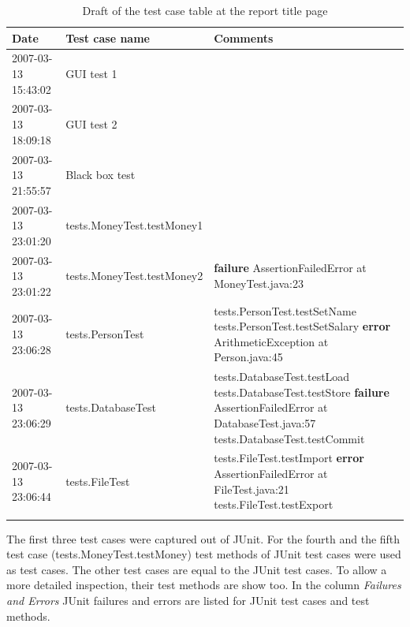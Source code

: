 \begin{footnotesize}
\begin{longtable}{l|l|p{6.9cm}}
   \textbf{\normalsize Date} &
   \textbf{\normalsize Test case name} &
   \textbf{\normalsize Comments} \\\hline

   2007-03-13 15:43:02 & GUI test 1 & \\\hline
   2007-03-13 18:09:18 & GUI test 2 & \\\hline
   2007-03-13 21:55:57 & Black box test & \\\hline

   2007-03-13 23:01:20 & tests.MoneyTest.testMoney1 & \\\hline
   2007-03-13 23:01:22 & tests.MoneyTest.testMoney2 &
     \textbf{{\color{JUnitFailure}failure}} \newline 
     AssertionFailedError at MoneyTest.java:23 \\\hline

   2007-03-13 23:06:28 & tests.PersonTest & 
     tests.PersonTest.testSetName \newline 
     tests.PersonTest.testSetSalary \newline
     \textbf{{\color{JUnitError}error}} \newline 
     ArithmeticException at Person.java:45 \\\hline

   2007-03-13 23:06:29 & tests.DatabaseTest &
     tests.DatabaseTest.testLoad \newline
     tests.DatabaseTest.testStore \newline
     \textbf{{\color{JUnitFailure}failure}} \newline 
     AssertionFailedError at DatabaseTest.java:57 \newline
     tests.DatabaseTest.testCommit \\\hline

   2007-03-13 23:06:44 & tests.FileTest &
     tests.FileTest.testImport \newline
     \textbf{{\color{JUnitFailure}error}} \newline 
     AssertionFailedError at FileTest.java:21 \newline
     tests.FileTest.testExport \\

  \caption{Draft of the test case table at the report title page}
  \label{fr_tb:Report: test case table}
\end{longtable}
\end{footnotesize}
\par
The first three test cases were captured out of JUnit. For the fourth and the fifth test case (tests.MoneyTest.testMoney) test methods of JUnit test cases were used as test cases. The other test cases are equal to the JUnit test cases. To allow a more detailed inspection, their test methods are show too. In the column \textit{Failures and Errors} JUnit failures and errors are listed for JUnit test cases and test methods.

